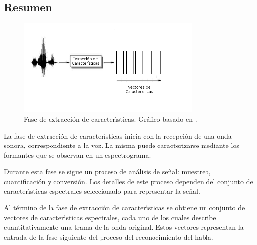 \subsection{Resumen}

\begin{figure}[H] 
\centering
\includegraphics[width=0.8\textwidth]{./graphics/extraccion.png}
\caption{Fase de extracci\'on de caracter{\'\i}sticas. Gr\'afico basado en \cite{VerenichASR}.}
\label{figure:hmm}
\end{figure}

La fase de extracci\'on de caracter{\'\i}sticas inicia con la recepci\'on de una onda sonora, correspondiente a la voz.
La misma puede caracterizarse mediante los formantes que se observan en un espectrograma.

Durante esta fase se sigue un proceso de an\'alisis de se\~nal: muestreo, cuantificaci\'on y conversi\'on.
Los detalles de este proceso dependen del conjunto de caracter{\'\i}sticas espectrales seleccionado 
para representar la se\~nal.

Al t\'ermino de la fase de extracci\'on de caracter{\'\i}sticas se obtiene un conjunto de vectores 
de caracter{\'\i}sticas espectrales, cada uno de los cuales describe cuantitativamente una trama de
la onda original. Estos vectores representan la entrada de la fase siguiente del proceso del reconocimiento del habla.